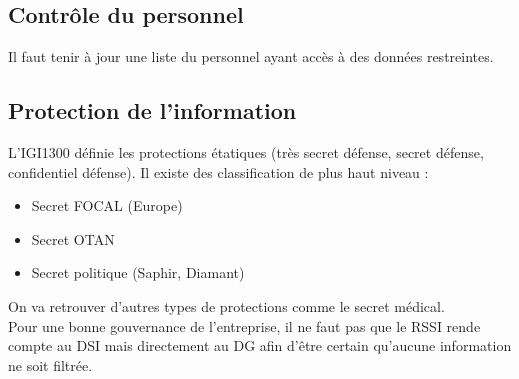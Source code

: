 \subsection{Contrôle du personnel}
Il faut tenir à jour une liste du personnel ayant accès à des données restreintes.
\subsection{Protection de l'information}
L'IGI1300 définie les protections étatiques (très secret défense, secret défense, confidentiel défense). Il existe des classification de plus haut niveau :
\begin{itemize}
 \item Secret FOCAL (Europe)
 \item Secret OTAN
 \item Secret politique (Saphir, Diamant)
\end{itemize}

On va retrouver d'autres types de protections comme le secret médical.\\
Pour une bonne gouvernance de l'entreprise, il ne faut pas que le RSSI rende compte au DSI mais directement au DG afin d'être certain qu'aucune information ne soit filtrée.